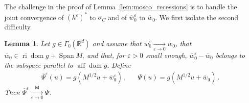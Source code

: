 \documentclass[11pt,english,reqno]{article}
\DeclareMathOperator{\Span}{Span}
\DeclareMathOperator{\dom}{dom}
\DeclareMathOperator{\ri}{ri}
\DeclareMathOperator{\aff}{aff}
\newcommand{\R}{\mathbb{R}}
\theoremstyle{plain}
\newtheorem{lem}[proposition]{Lemma}
\theoremstyle{definition}
\theoremstyle{remark}
\numberwithin{equation}{section}
\begin{document}
The challenge in the proof of Lemma~\ref{lem:mosco_recessions} is to handle the joint convergence of $(h^\varepsilon)^*$ to $\sigma_C$ and of $\overline{w}_0^\varepsilon$ to $\overline{w}_0$. We first isolate the second difficulty.

\begin{lem}
	\label{lem:mosco_recessions_rec}
	Let $g \in \Gamma_0(\R^d)$ and assume that $\overline{w}_0^\varepsilon \xrightarrow[\varepsilon\to 0]{} \overline{w}_0$, that $\overline{w}_0 \in \ri \dom g + \Span M$, and that, for $\varepsilon > 0$ small enough, $\overline{w}_0^\varepsilon - \overline{w}_0$ belongs to the subspace parallel to $\aff \dom g$. Define
	\begin{align*}
		&\overline{\Psi}^\varepsilon(u) = g(M^{1/2} u + \overline{w}_0^\varepsilon) \, , && \Psi(u) = g(M^{1/2} u + \overline{w}_0) \, .
	\end{align*}
	Then $\overline{\Psi}^\varepsilon \xrightarrow[\varepsilon \to 0]{\mathsf{M}} \Psi$.
\end{lem}
\end{document}
